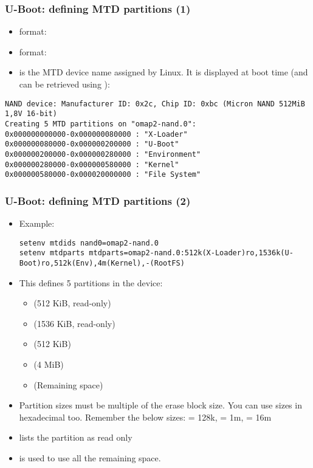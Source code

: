 \begin{frame}[fragile]
  \frametitle{U-Boot: defining MTD partitions (1)}
  \begin{itemize}
  \item {} format: 
  \item {} format: 
  \item {} is the MTD device name assigned by Linux. It
    is displayed at boot time (and can be retrieved using ):
  \end{itemize}
\tiny
\begin{verbatim}
NAND device: Manufacturer ID: 0x2c, Chip ID: 0xbc (Micron NAND 512MiB 1,8V 16-bit)
Creating 5 MTD partitions on "omap2-nand.0":
0x000000000000-0x000000080000 : "X-Loader"
0x000000080000-0x000000200000 : "U-Boot"
0x000000200000-0x000000280000 : "Environment"
0x000000280000-0x000000580000 : "Kernel"
0x000000580000-0x000020000000 : "File System"
\end{verbatim}
\end{frame}

\begin{frame}[fragile]
  \frametitle{U-Boot: defining MTD partitions (2)}
  \begin{itemize}
  \item Example:
  {\tiny
  \begin{verbatim}
setenv mtdids nand0=omap2-nand.0
setenv mtdparts mtdparts=omap2-nand.0:512k(X-Loader)ro,1536k(U-Boot)ro,512k(Env),4m(Kernel),-(RootFS)
  \end{verbatim}
  }
  \item This defines 5 partitions in the  device:
    \begin{itemize}
    \item {} (512 KiB, read-only)
    \item {} (1536 KiB, read-only)
    \item {} (512 KiB)
    \item {} (4 MiB)
    \item {} (Remaining space)
    \end{itemize}
  \item Partition sizes must be multiple of the erase block size.
    You can use sizes in hexadecimal too. Remember the below sizes:
     = 128k,  = 1m,  = 16m
  \item {} lists the partition as read only
  \item \code{-} is used to use all the remaining space.
  \end{itemize}
\end{frame}

